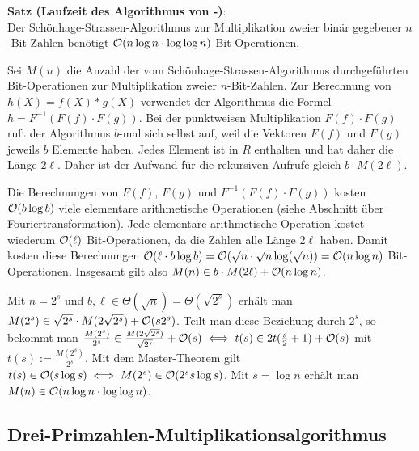 \linie

\textbf{Satz (Laufzeit des Algorithmus von -)}:\\
Der Schönhage-Strassen-Algorithmus zur Multiplikation zweier binär gegebener $n$-Bit-Zahlen
benötigt $\mathcal{O}(n \log n \cdot \log \log n)$ Bit-Operationen.

\begin{Beweis}
    Sei $M(n)$ die Anzahl der vom Schönhage-Strassen-Algorithmus durchgeführten
    Bit-Operationen zur Multiplikation zweier $n$-Bit-Zahlen.
    Zur Berechnung von $h(X) = f(X) \ast g(X)$ verwendet der Algorithmus die Formel
    $h = F^{-1}(F(f) \cdot F(g))$.
    Bei der punktweisen Multiplikation $F(f) \cdot F(g)$ ruft der Algorithmus $b$-mal sich selbst
    auf, weil die Vektoren $F(f)$ und $F(g)$ jeweils $b$ Elemente haben.
    Jedes Element ist in $R$ enthalten und hat daher die Länge $2\ell$.
    Daher ist der Aufwand für die rekursiven Aufrufe gleich $b \cdot M(2\ell)$.
    
    Die Berechnungen von $F(f)$, $F(g)$ und $F^{-1}(F(f) \cdot F(g))$ kosten
    $\mathcal{O}(b \log b)$ viele elementare arithmetische Operationen
    (siehe Abschnitt über Fouriertransformation).
    Jede elementare arithmetische Operation kostet wiederum $\mathcal{O}(\ell)$ Bit-Operationen,
    da die Zahlen alle Länge $2\ell$ haben.
    Damit kosten diese Berechnungen
    $\mathcal{O}(\ell \cdot b \log b) = \mathcal{O}(\sqrt{n} \cdot \sqrt{n} \log(\sqrt{n})) = \mathcal{O}(n \log n)$
    Bit-Operationen.
    Insgesamt gilt also $M(n) \in b \cdot M(2\ell) + \mathcal{O}(n \log n)$.
    
    Mit $n = 2^s$ und $b, \ell \in \Theta(\sqrt{n}) = \Theta(\sqrt{2^s})$ erhält man
    $M(2^s) \in \sqrt{2^s} \cdot M(2\sqrt{2^s}) + \mathcal{O}(s 2^s)$.
    Teilt man diese Beziehung durch $2^s$, so bekommt man
    $\frac{M(2^s)}{2^s} \in \frac{M(2\sqrt{2^s})}{\sqrt{2^s}} + \mathcal{O}(s)
    \iff t(s) \in 2t(\frac{s}{2} + 1) + \mathcal{O}(s)$
    mit $t(s) := \frac{M(2^s)}{2^s}$.
    Mit dem Master-Theorem gilt $t(s) \in \mathcal{O}(s \log s) \iff M(2^s) \in \mathcal{O}(2^s s \log s)$.
    Mit $s = \log n$ erhält man $M(n) \in \mathcal{O}(n \log n \cdot \log \log n)$.
\end{Beweis}

\pagebreak

\subsection{%
    Drei-Primzahlen-Multiplikationsalgorithmus%
}

